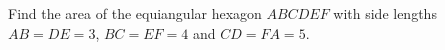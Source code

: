 Find the area of the equiangular hexagon $ABCDEF$ with side lengths $AB=DE=3$, $BC=EF=4$ and $CD=FA=5$.

